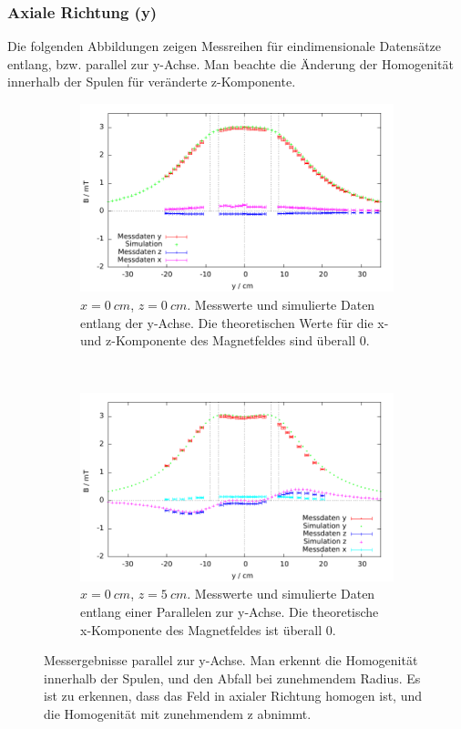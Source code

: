 \documentclass[12pt,a4paper]{article}
\begin{document}
\subsubsection*{Axiale Richtung (y)}
Die folgenden Abbildungen zeigen Messreihen für eindimensionale Datensätze entlang, bzw. parallel zur y-Achse. Man beachte die Änderung der Homogenität innerhalb der Spulen für veränderte z-Komponente.
\begin{figure}[H]
	
	\centering
	\begin{subfigure}[c]{0.8\textwidth}
	\centering
	\includegraphics[scale=0.9]{abs1_Auswertung_Axial_1.pdf}
	\caption{$x=\SI{0}{cm}$, $z=\SI{0}{cm}$. Messwerte und simulierte Daten entlang der y-Achse. Die theoretischen Werte für die x- und z-Komponente des Magnetfeldes sind überall 0.}
	\end{subfigure}
	\\
	\begin{subfigure}[c]{0.8\textwidth}
		\centering
		\includegraphics[scale=0.9]{abs1_Auswertung_Axial_2.pdf}
		\caption{$x=\SI{0}{cm}$, $z=\SI{5}{cm}$. Messwerte und simulierte Daten entlang einer Parallelen zur y-Achse. Die theoretische x-Komponente des Magnetfeldes ist überall 0. }
		\label{exp1a}
	\end{subfigure}
	\caption{Messergebnisse parallel zur y-Achse. Man erkennt die Homogenität innerhalb der Spulen, und den Abfall bei zunehmendem Radius. Es ist zu erkennen, dass das Feld in axialer Richtung homogen ist, und die Homogenität mit zunehmendem z abnimmt.}
	\label{fig:exp1}
\end{figure}
\end{document}
